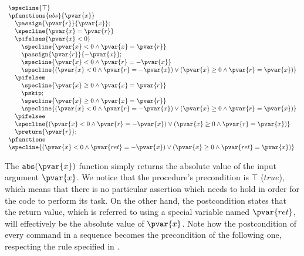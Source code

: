 \begin{gather*}
\begin{array}{l}
\specline{\top} \\
\pfunctions{abs}{\pvar{x}} \\
	\quad \passign{\pvar{r}}{\pvar{x}}; \\
	\quad \specline{\pvar{x} = \pvar{r}} \\
	\quad \pifelses{\pvar{x} < 0} \\
		\quad \quad \specline{\pvar{x} < 0 \land \pvar{x} = \pvar{r}} \\
		\quad \quad \passign{\pvar{r}}{-\pvar{x}}; \\
		\quad \quad \specline{\pvar{x} < 0 \land \pvar{r} = - \pvar{x}} \\
		\quad \quad \specline{(\pvar{x} < 0 \land \pvar{r} = -\pvar{x}) \lor (\pvar{x} \geq 0 \land \pvar{r} = \pvar{x})} \\
	\quad \pifelsem \\
		\quad \quad \specline{\pvar{x} \geq 0 \land \pvar{x} = \pvar{r}} \\
		\quad \quad \pskip; \\
		\quad \quad \specline{\pvar{x} \geq 0 \land \pvar{x} = \pvar{r}} \\
		\quad \quad \specline{(\pvar{x} < 0 \land \pvar{r} = -\pvar{x}) \lor (\pvar{x} \geq 0 \land \pvar{r} = \pvar{x})} \\
	\quad \pifelsee \\
	\quad \specline{(\pvar{x} < 0 \land \pvar{r} = -\pvar{x}) \lor (\pvar{x} \geq 0 \land \pvar{r} = \pvar{x})} \\
	\quad \preturn{\pvar{r}}; \\
\pfunctione \\
\specline{(\pvar{x} < 0 \land \pvar{ret} = -\pvar{x}) \lor (\pvar{x} \geq 0 \land \pvar{ret} = \pvar{x})} \\
\end{array}
\end{gather*}
\label{fig:abshoare} 

The $\mathtt{abs}(\pvar{x})$ function simply returns the absolute value of the input argument $\pvar{x}$. We notice that the procedure's precondition is $\top$ ($true$), which means that there is no particular assertion which needs to hold in order for the code to perform its task. On the other hand, the postcondition states that the return value, which is referred to using a special variable named $\pvar{ret}$, will effectively be the absolute value of $\pvar{x}$. Note how the postcondition of every command in a sequence becomes the precondition of the following one, respecting the rule specified in \cite{hoare}.

